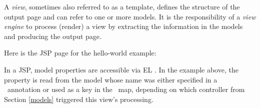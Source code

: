 A {\em view}, sometimes also referred to as a template, defines the structure of the output
page and can refer to one or more models. It is the responsibility of a {\em view engine}
to process (render) a view by extracting the information in the models and producing the
output page. 

Here is the JSP page for the hello-world example:


In a JSP, model properties are accessible via EL \cite{el}. In the example above,
the property  is read from the  model whose name
was either specified in a \Named\ annotation or used as a key in the \Models\ map, 
depending on which controller from Section \ref{models} triggered this view's 
processing.

